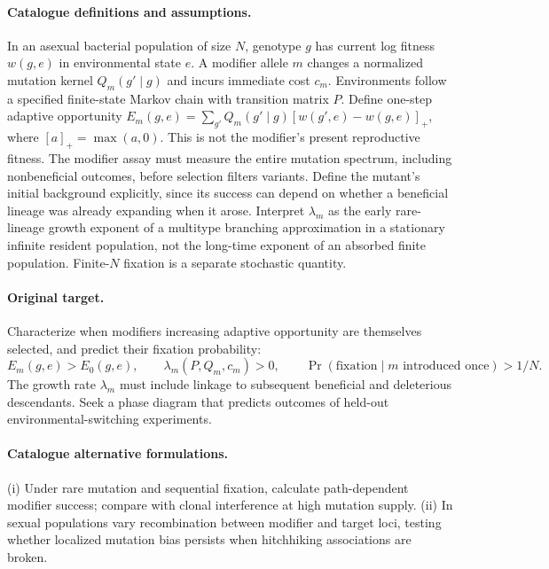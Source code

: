 \documentclass[11pt]{article}
\begin{document}
\paragraph{Catalogue definitions and assumptions.}
In an asexual bacterial population of size $N$, genotype $g$ has current log fitness $w(g,e)$ in environmental state $e$. A modifier allele $m$ changes a normalized mutation kernel $Q_m(g'\mid g)$ and incurs immediate cost $c_m$. Environments follow a specified finite-state Markov chain with transition matrix $P$. Define one-step adaptive opportunity $E_m(g,e)=\sum_{g'}Q_m(g'\mid g)[w(g',e)-w(g,e)]_+$, where $[a]_+=\max(a,0)$. This is not the modifier's present reproductive fitness. The modifier assay must measure the entire mutation spectrum, including nonbeneficial outcomes, before selection filters variants. Define the mutant's initial background explicitly, since its success can depend on whether a beneficial lineage was already expanding when it arose. Interpret $\lambda_m$ as the early rare-lineage growth exponent of a multitype branching approximation in a stationary infinite resident population, not the long-time exponent of an absorbed finite population. Finite-$N$ fixation is a separate stochastic quantity.
\paragraph{Original target.}
Characterize when modifiers increasing adaptive opportunity are themselves selected, and predict their fixation probability:
\[
 E_m(g,e)>E_0(g,e),\qquad
 \lambda_m(P,Q_m,c_m)>0,
 \qquad \Pr(\mathrm{fixation}\mid m\text{ introduced once})>1/N.
\]
The growth rate $\lambda_m$ must include linkage to subsequent beneficial and deleterious descendants. Seek a phase diagram that predicts outcomes of held-out environmental-switching experiments.
\paragraph{Catalogue alternative formulations.}
(i) Under rare mutation and sequential fixation, calculate path-dependent modifier success; compare with clonal interference at high mutation supply. (ii) In sexual populations vary recombination between modifier and target loci, testing whether localized mutation bias persists when hitchhiking associations are broken.
\end{document}

